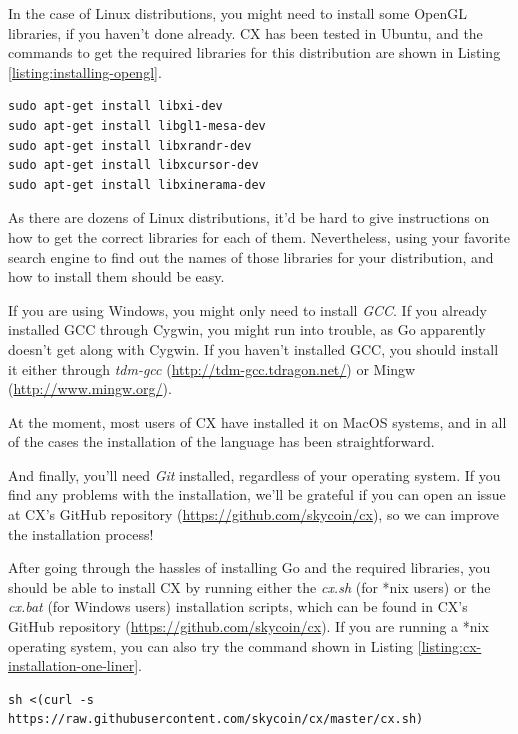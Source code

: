 \documentclass[11pt,fleqn,openany]{book} %
\begin{document}
In the case of Linux distributions, you might need to install some OpenGL libraries, if you haven't done already. CX has been tested in Ubuntu, and the commands to get the required libraries for this distribution are shown in Listing \ref{listing:installing-opengl}.

\begin{lstlisting}[caption={Installing Required OpenGL Libraries in Ubuntu},captionpos=b,label={listing:installing-opengl}]
sudo apt-get install libxi-dev
sudo apt-get install libgl1-mesa-dev
sudo apt-get install libxrandr-dev
sudo apt-get install libxcursor-dev
sudo apt-get install libxinerama-dev
\end{lstlisting}

As there are dozens of Linux distributions, it'd be hard to give instructions on how to get the correct libraries for each of them. Nevertheless, using your favorite search engine to find out the names of those libraries for your distribution, and how to install them should be easy.

If you are using Windows, you might only need to install \emph{GCC}. If you already installed GCC through Cygwin, you might run into trouble, as Go apparently doesn't get along with Cygwin. If you haven't installed GCC, you should install it either through \emph{tdm-gcc} (\url{http://tdm-gcc.tdragon.net/}) or Mingw (\url{http://www.mingw.org/}).

At the moment, most users of CX have installed it on MacOS systems, and in all of the cases the installation of the language has been straightforward.

And finally, you'll need \emph{Git} installed, regardless of your operating system. If you find any problems with the installation, we'll be grateful if you can open an issue at CX's GitHub repository (\url{https://github.com/skycoin/cx}), so we can improve the installation process!

After going through the hassles of installing Go and the required libraries, you should be able to install CX by running either the \emph{cx.sh} (for *nix users) or the \emph{cx.bat} (for Windows users) installation scripts, which can be found in CX's GitHub repository (\url{https://github.com/skycoin/cx}). If you are running a *nix operating system, you can also try the command shown in Listing \ref{listing:cx-installation-one-liner}.

\begin{lstlisting}[caption={One-liner CX Installation Script for *nix Systems},captionpos=b,label={listing:cx-installation-one-liner}]
sh <(curl -s https://raw.githubusercontent.com/skycoin/cx/master/cx.sh)
\end{lstlisting}
\end{document}
